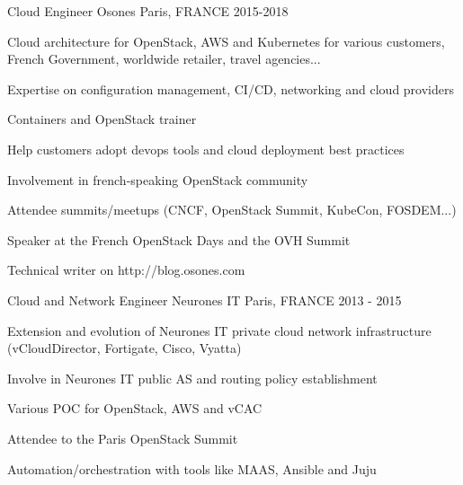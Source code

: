 \begin{cventries}
  \cventry
    {Cloud Engineer} %
    {Osones} %
    {Paris, FRANCE} %
    {2015-2018} %
    {
      \begin{cvitems} %
      \item {Cloud architecture for OpenStack, AWS and Kubernetes for various
       customers, French Government, worldwide retailer, travel agencies...}
      \item {Expertise on configuration management, CI/CD, networking and cloud
       providers}
      \item {Containers and OpenStack trainer}
      \item {Help customers adopt devops tools and cloud deployment best
       practices}
      \item {Involvement in french-speaking OpenStack community}
      \item {Attendee summits/meetups (CNCF, OpenStack Summit, KubeCon, FOSDEM...)}
      \item {Speaker at the French OpenStack Days and the OVH Summit}
      \item {Technical writer on http://blog.osones.com}
      \end{cvitems}
    }

  \cventry
    {Cloud and Network Engineer}
    {Neurones IT} %
    {Paris, FRANCE} %
    {2013 - 2015} %
    {
      \begin{cvitems} %
        \item {Extension and evolution of Neurones IT private cloud
          network infrastructure (vCloudDirector, Fortigate, Cisco, Vyatta)}
        \item {Involve in Neurones IT public AS and routing policy
          establishment}
        \item {Various POC for OpenStack, AWS and vCAC}
        \item {Attendee to the Paris OpenStack Summit}
        \item {Automation/orchestration with tools like MAAS, Ansible and Juju}
      \end{cvitems}
    }

\end{cventries}
